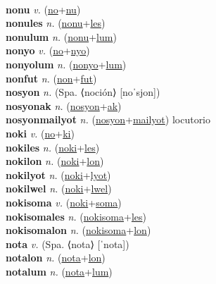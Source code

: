  \label{non} \\
\textbf{nonu} \textit{v.} (\hyperref[no]{no}+\hyperref[nu]{nu})
 \label{nonu} \\
\textbf{nonules} \textit{n.} (\hyperref[nonu]{nonu}+\hyperref[les]{les})
 \label{nonules} \\
\textbf{nonulum} \textit{n.} (\hyperref[nonu]{nonu}+\hyperref[lum]{lum})
 \label{nonulum} \\
\textbf{nonyo} \textit{v.} (\hyperref[no]{no}+\hyperref[nyo]{nyo})
 \label{nonyo} \\
\textbf{nonyolum} \textit{n.} (\hyperref[nonyo]{nonyo}+\hyperref[lum]{lum})
 \label{nonyolum} \\
\textbf{nonfut} \textit{n.} (\hyperref[non]{non}+\hyperref[fut]{fut})
 \label{nonfut} \\
\textbf{nosyon} \textit{n.} (Spa. ⟨noción⟩ [noˈsjon])
 \label{nosyon} \\
\textbf{nosyonak} \textit{n.} (\hyperref[nosyon]{nosyon}+\hyperref[ak]{ak})
 \label{nosyonak} \\
\textbf{nosyonmailyot} \textit{n.} (\hyperref[nosyon]{nosyon}+\hyperref[mailyot]{mailyot})
locutorio \label{nosyonmailyot} \\
\textbf{noki} \textit{v.} (\hyperref[no]{no}+\hyperref[ki]{ki})
 \label{noki} \\
\textbf{nokiles} \textit{n.} (\hyperref[noki]{noki}+\hyperref[les]{les})
 \label{nokiles} \\
\textbf{nokilon} \textit{n.} (\hyperref[noki]{noki}+\hyperref[lon]{lon})
 \label{nokilon} \\
\textbf{nokilyot} \textit{n.} (\hyperref[noki]{noki}+\hyperref[lyot]{lyot})
 \label{nokilyot} \\
\textbf{nokilwel} \textit{n.} (\hyperref[noki]{noki}+\hyperref[lwel]{lwel})
 \label{nokilwel} \\
\textbf{nokisoma} \textit{v.} (\hyperref[noki]{noki}+\hyperref[soma]{soma})
 \label{nokisoma} \\
\textbf{nokisomales} \textit{n.} (\hyperref[nokisoma]{nokisoma}+\hyperref[les]{les})
 \label{nokisomales} \\
\textbf{nokisomalon} \textit{n.} (\hyperref[nokisoma]{nokisoma}+\hyperref[lon]{lon})
 \label{nokisomalon} \\
\textbf{nota} \textit{v.} (Spa. ⟨nota⟩ [ˈnota])
 \label{nota} \\
\textbf{notalon} \textit{n.} (\hyperref[nota]{nota}+\hyperref[lon]{lon})
 \label{notalon} \\
\textbf{notalum} \textit{n.} (\hyperref[nota]{nota}+\hyperref[lum]{lum})
